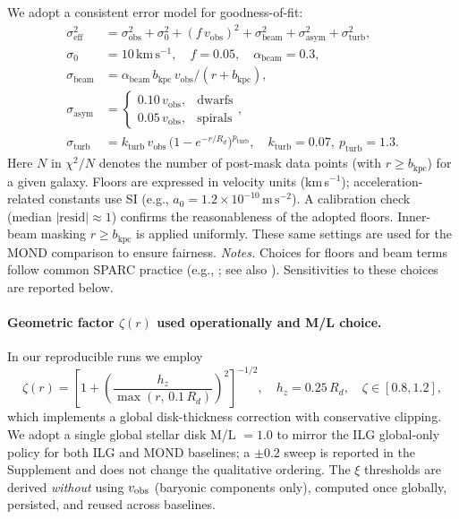 \documentclass[12pt,a4paper]{article}
\begin{document}
We adopt a consistent error model for goodness-of-fit:
\begin{align}
\sigma_\mathrm{eff}^2 &= \sigma_\mathrm{obs}^2 + \sigma_0^2 + (f\,v_\mathrm{obs})^2 + \sigma_\mathrm{beam}^2 + \sigma_\mathrm{asym}^2 + \sigma_\mathrm{turb}^2,\\
\sigma_0 &= 10\,\mathrm{km\,s^{-1}},\quad f = 0.05,\quad \alpha_\mathrm{beam}=0.3,\\
\sigma_\mathrm{beam} &= \alpha_\mathrm{beam}\, b_\mathrm{kpc}\, v_\mathrm{obs}/(r+b_\mathrm{kpc}),\\
\sigma_\mathrm{asym} &= \begin{cases}0.10\,v_\mathrm{obs}, & \text{dwarfs}\\ 0.05\,v_\mathrm{obs}, & \text{spirals}\end{cases},\\
\sigma_\mathrm{turb} &= k_\mathrm{turb}\, v_\mathrm{obs}\,\big(1-e^{-r/R_d}\big)^{p_\mathrm{turb}},\quad k_\mathrm{turb}=0.07,\ p_\mathrm{turb}=1.3.
\end{align}
\noindent Here $N$ in $\chi^2/N$ denotes the number of post-mask data points (with $r\ge b_\mathrm{kpc}$) for a given galaxy. Floors are expressed in velocity units (km\,s$^{-1}$); acceleration-related constants use SI (e.g., $a_0=1.2\times10^{-10}\,\mathrm{m\,s^{-2}}$). A calibration check (median $|\mathrm{resid}|\approx1$) confirms the reasonableness of the adopted floors.
Inner-beam masking $r\ge b_\mathrm{kpc}$ is applied uniformly. These same settings are used for the MOND comparison to ensure fairness.
\noindent\textit{Notes.} Choices for floors and beam terms follow common SPARC practice (e.g., \citealp{lelli2016sparc}; see also \citealp{mcgaugh2016}). Sensitivities to these choices are reported below.
\paragraph{Geometric factor $\zeta(r)$ used operationally and M/L choice.} In our reproducible runs we employ
\begin{equation}
\zeta(r) = \left[1 + \left( \frac{h_z}{\max(r,\,0.1\,R_d)} \right)^2 \right]^{-1/2},\quad h_z = 0.25\,R_d,\quad \zeta\in[0.8,1.2],
\end{equation}
which implements a global disk-thickness correction with conservative clipping. We adopt a single global stellar disk M/L $=1.0$ to mirror the ILG global-only policy for both ILG and MOND baselines; a \(\pm 0.2\) sweep is reported in the Supplement and does not change the qualitative ordering. The $\xi$ thresholds are derived \emph{without} using $v_{\rm obs}$ (baryonic components only), computed once globally, persisted, and reused across baselines.
\end{document}
